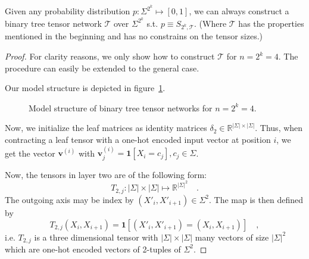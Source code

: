 \documentclass[../../main.tex]{subfiles}
\begin{document}
    \begin{proposition}
        Given any probability distribution $p: \Sigma^{2^k} \mapsto [0,1]$, we can always construct a binary tree tensor network $\mathcal{T}$ over $\Sigma^{2^k}$ s.t. $p \equiv S_{2^k, \mathcal{T}}$. (Where $\mathcal{T}$ has the properties mentioned in the beginning and has no constrains on the tensor sizes.)
    \end{proposition}
    \vspace{-2.5em}
    \begin{proof}
        For clarity reasons, we only show how to construct $\mathcal{T}$ for $n = 2^k = 4$. The procedure can easily be extended to the general case.

        Our model structure is depicted in figure~\ref{fig:binary_tree_tensor_network_n_equals_four}.

        \begin{figure}[h]
        \centering
        \caption{Model structure of binary tree tensor networks for $n = 2^k = 4$.}
        \label{fig:binary_tree_tensor_network_n_equals_four}
    \end{figure}

    Now, we initialize the leaf matrices as identity matrices $\delta_2 \in \mathbb{R}^{|\Sigma| \times |\Sigma|}$. Thus, when contracting a leaf tensor with a one-hot encoded input vector at position $i$, we get the vector $\bm{v}^{(i)}$ with $\bm{v}^{(i)}_j = \bm{1}[X_i = c_j], c_j \in \Sigma$.

    Now, the tensors in layer two are of the following form:
    \[
    T_{2, j}: |\Sigma| \times |\Sigma| \mapsto \mathbb{R}^{|\Sigma|^2} \quad .
    \]
    The outgoing axis may be index by $(X'_i, X'_{i + 1}) \in \Sigma^2$. The map is then defined by
    \[
        T_{2, j}(X_i, X_{i + 1}) = \bm{1}[(X'_i, X'_{i + 1}) = (X_i, X_{i + 1})] \quad ,
    \]
    i.e. $T_{2, j}$ is a three dimensional tensor with $|\Sigma| \times |\Sigma|$ many vectors of size $|\Sigma|^2$ which are one-hot encoded vectors of 2-tuples of $\Sigma^2$.


\end{proof}
\end{document}
